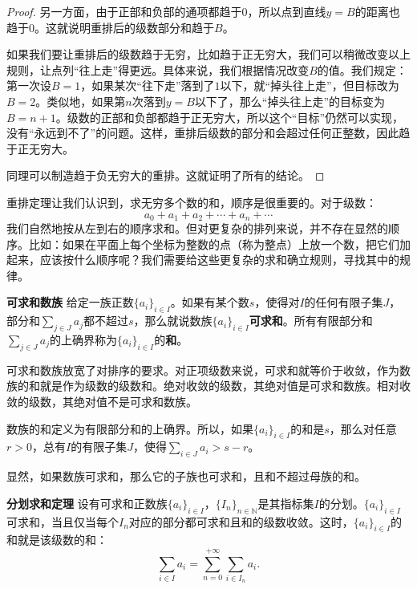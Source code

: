 \documentclass[12pt,UTF8,fontset=none]{ctexbook}
\begin{document}
\begin{proof}
    另一方面，由于正部和负部的通项都趋于$0$，所以点到直线$y = B$的距离也趋于$0$。这就说明重排后的级数部分和趋于$B$。

    如果我们要让重排后的级数趋于无穷，比如趋于正无穷大，我们可以稍微改变以上规则，让点列“往上走”得更远。具体来说，我们根据情况改变$B$的值。我们规定：第一次设$B = 1$，如果某次“往下走”落到了$1$以下，就“掉头往上走”，但目标改为$B=2$。类似地，如果第$n$次落到$y = B$以下了，那么“掉头往上走”的目标变为$B = n + 1$。级数的正部和负部都趋于正无穷大，所以这个“目标”仍然可以实现，没有“永远到不了”的问题。这样，重排后级数的部分和会超过任何正整数，因此趋于正无穷大。

    同理可以制造趋于负无穷大的重排。这就证明了所有的结论。

\end{proof}

重排定理让我们认识到，求无穷多个数的和，顺序是很重要的。对于级数：
$$ a_0 + a_1 + a_2 + \cdots + a_n + \cdots $$
我们自然地按从左到右的顺序求和。但对更复杂的排列来说，并不存在显然的顺序。比如：如果在平面上每个坐标为整数的点（称为整点）上放一个数，把它们加起来，应该按什么顺序呢？我们需要给这些更复杂的求和确立规则，寻找其中的规律。

\begin{df}{\textbf{可求和数族}}
    给定一族正数$\{a_i\}_{i\in I}$。如果有某个数$s$，使得对$I$的任何有限子集$J$，部分和$\sum_{j\in J} a_j$都不超过$s$，那么就说数族$\{a_i\}_{i\in I}$\textbf{可求和}。所有有限部分和$\sum_{j\in J} a_j$的上确界称为$\{a_i\}_{i\in I}$的\textbf{和}。
\end{df}

可求和数族放宽了对排序的要求。对正项级数来说，可求和就等价于收敛，作为数族的和就是作为级数的级数和。绝对收敛的级数，其绝对值是可求和数族。相对收敛的级数，其绝对值不是可求和数族。

数族的和定义为有限部分和的上确界。所以，如果$\{a_i\}_{i\in I}$的和是$s$，那么对任意$r>0$，总有$I$的有限子集$J$，使得$\sum_{i\in J} a_i > s - r$。

显然，如果数族可求和，那么它的子族也可求和，且和不超过母族的和。

\begin{tm}{\textbf{分划求和定理}}
    设有可求和正数族$\{a_i\}_{i\in I}$，$\{I_n\}_{n\in\mathbb{N}}$是其指标集$I$的分划。$\{a_i\}_{i\in I}$可求和，当且仅当每个$I_n$对应的部分都可求和且和的级数收敛。这时，$\{a_i\}_{i\in I}$的和就是该级数的和：
    $$ \sum_{i\in I} a_i = \sum_{n=0}^{+\infty} \sum_{i\in I_n} a_i. $$
\end{tm}
\end{document}
